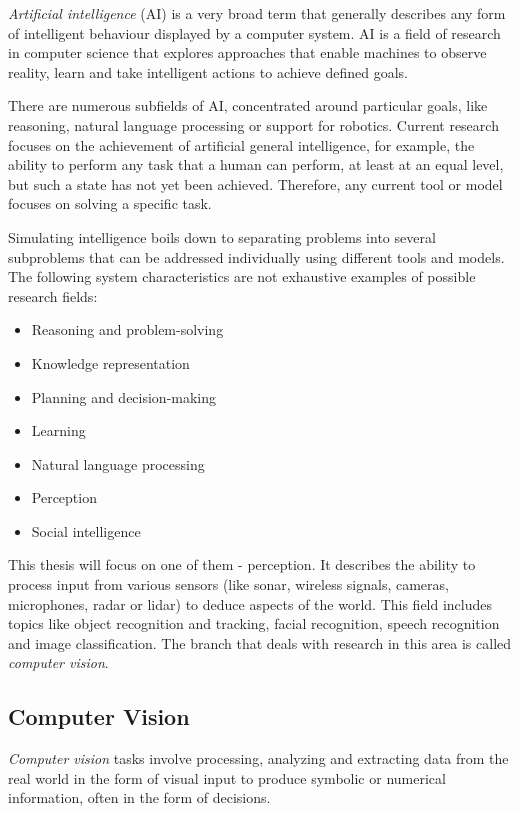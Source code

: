 \emph{Artificial intelligence} (AI) is a very broad term that generally describes any form of intelligent behaviour displayed by a computer system. AI is a field of research in computer science that explores approaches that enable machines to observe reality, learn and take intelligent actions to achieve defined goals.

There are numerous subfields of AI, concentrated around particular goals, like reasoning, natural language processing or support for robotics. Current research focuses on the achievement of artificial general intelligence, for example, the ability to perform any task that a human can perform, at least at an equal level, but such a state has not yet been achieved. Therefore, any current tool or model focuses on solving a specific task.

Simulating intelligence boils down to separating problems into several subproblems that can be addressed individually using different tools and models. The following system characteristics are not exhaustive examples of possible research fields:

\begin{itemize}
    \item Reasoning and problem-solving
    \item Knowledge representation
    \item Planning and decision-making
    \item Learning
    \item Natural language processing
    \item Perception
    \item Social intelligence
\end{itemize}

This thesis will focus on one of them - perception. It describes the ability to process input from various sensors (like sonar, wireless signals, cameras, microphones, radar or lidar) to deduce aspects of the world. This field includes topics like object recognition and tracking, facial recognition, speech recognition and image classification. The branch that deals with research in this area is called \emph{computer vision}. \cite{russell_norvig_2020}

\subsection{Computer Vision}

\emph{Computer vision} tasks involve processing, analyzing and extracting data from the real world in the form of visual input to produce symbolic or numerical information, often in the form of decisions. \cite{klette_2014}

